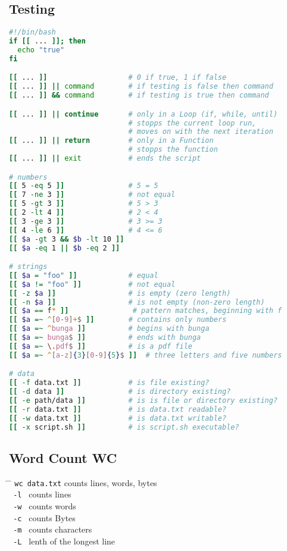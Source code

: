 \documentclass[a4paper,10pt]{article}
\begin{document}
\subsection{Testing}
\begin{lstlisting}[language=bash]
#!/bin/bash 
if [[ ... ]]; then 
  echo "true"
fi 

[[ ... ]]                   # 0 if true, 1 if false 
[[ ... ]] || command        # if testing is false then command 
[[ ... ]] && command        # if testing is true then command 

[[ ... ]] || continue       # only in a Loop (if, while, until) 
                            # stopps the current loop run, 
                            # moves on with the next iteration
[[ ... ]] || return         # only in a Function 
                            # stopps the function
[[ ... ]] || exit           # ends the script

# numbers
[[ 5 -eq 5 ]]               # 5 = 5 
[[ 7 -ne 3 ]]               # not equal 
[[ 5 -gt 3 ]]               # 5 > 3 
[[ 2 -lt 4 ]]               # 2 < 4 
[[ 3 -ge 3 ]]               # 3 >= 3 
[[ 4 -le 6 ]]               # 4 <= 6
[[ $a -gt 3 && $b -lt 10 ]]
[[ $a -eq 1 || $b -eq 2 ]]

# strings 
[[ $a = "foo" ]]            # equal 
[[ $a != "foo" ]]           # not equal 
[[ -z $a ]]                 # is empty (zero length)
[[ -n $a ]]                 # is not empty (non-zero length)
[[ $a == f* ]]               # pattern matches, beginning with f 
[[ $a =~ ^[0-9]+$ ]]        # contains only numbers 
[[ $a =~ ^bunga ]]          # begins with bunga 
[[ $a =~ bunga$ ]]          # ends with bunga 
[[ $a =~ \.pdf$ ]]          # is a pdf file 
[[ $a =~ ^[a-z]{3}[0-9]{5}$ ]]  # three letters and five numbers

# data 
[[ -f data.txt ]]           # is file existing?
[[ -d data ]]               # is directory existing? 
[[ -e path/data ]]          # is is file or directory existing?
[[ -r data.txt ]]           # is data.txt readable? 
[[ -w data.txt ]]           # is data.txt writable? 
[[ -x script.sh ]]          # is script.sh executable?
\end{lstlisting}

\subsection{Word Count WC}
\begin{tabbing}
	\= \hspace{30mm} \= \hspace{50mm} \kill
	\> \verb|wc data.txt| \> counts lines, words, bytes \\
	\> \verb| -l | \> counts lines \\
	\> \verb| -w | \> counts words \\
	\> \verb| -c | \> counts Bytes \\
	\> \verb| -m | \> counts characters \\
	\> \verb| -L | \> lenth of the longest line \\
\end{tabbing}
\end{document}
